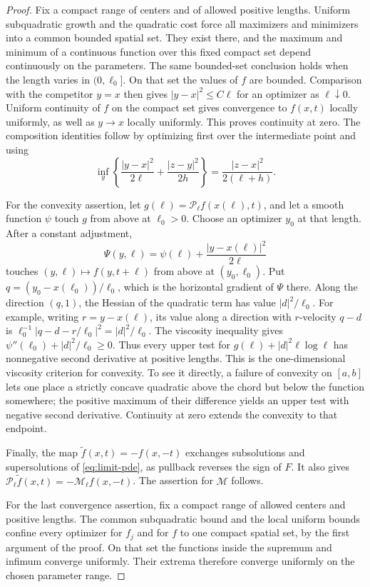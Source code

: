 \documentclass[11pt]{article}
\numberwithin{equation}{section}
\theoremstyle{definition}
\theoremstyle{remark}
\newcommand{\Penv}{\mathcal{P}}
\newcommand{\Menv}{\mathcal{M}}
\begin{document}
\begin{proof}
Fix a compact range of centers and of allowed positive lengths.
Uniform subquadratic growth and the quadratic cost force all
maximizers and minimizers into a common bounded spatial set.
They exist there, and the maximum and minimum of a continuous
function over this fixed compact set depend continuously on the
parameters. The same bounded-set conclusion holds when the
length varies in $(0,\ell_0]$. On that set the values of $f$ are
bounded. Comparison with the competitor $y=x$ then gives
$|y-x|^2\le C\ell$ for an optimizer as $\ell\downarrow0$.
Uniform continuity of $f$ on the compact set gives convergence
to $f(x,t)$ locally uniformly, as well as $y\to x$ locally
uniformly. This proves continuity at zero. The composition
identities follow by optimizing first over the intermediate
point and using
\[
  \inf_y\left\{\frac{|y-x|^2}{2\ell}
           +\frac{|z-y|^2}{2h}\right\}
       =\frac{|z-x|^2}{2(\ell+h)}.
\]

For the convexity assertion, let
$g(\ell)=\Penv_\ell f(x(\ell),t)$, and let a smooth function
$\psi$ touch $g$ from above at $\ell_0>0$. Choose an optimizer
$y_0$ at that length. After a constant adjustment,
\[
  \Psi(y,\ell)=\psi(\ell)+\frac{|y-x(\ell)|^2}{2\ell}
\]
touches $(y,\ell)\mapsto f(y,t+\ell)$ from above at
$(y_0,\ell_0)$. Put $q=(y_0-x(\ell_0))/\ell_0$, which is the
horizontal gradient of $\Psi$ there. Along the direction
$(q,1)$, the Hessian of the quadratic term has value
$|d|^2/\ell_0$. For example, writing $r=y-x(\ell)$, its value
along a direction with $r$-velocity $q-d$ is
$\ell_0^{-1}|q-d-r/\ell_0|^2=|d|^2/\ell_0$.
The viscosity inequality gives
$\psi''(\ell_0)+|d|^2/\ell_0\ge0$. Thus every upper test for
$g(\ell)+|d|^2\ell\log\ell$ has nonnegative second derivative
at positive lengths. This is the one-dimensional viscosity
criterion for convexity. To see it directly, a failure of
convexity on $[a,b]$ lets one place a strictly concave quadratic
above the chord but below the function somewhere; the positive
maximum of their difference yields an upper test with negative
second derivative. Continuity at zero extends the convexity to
that endpoint.

Finally, the map $\widetilde f(x,t)=-f(x,-t)$ exchanges
subsolutions and supersolutions of \eqref{eq:limit-pde}, as
pullback reverses the sign of $F$. It also gives
$\Penv_\ell\widetilde f(x,t)=-\Menv_\ell f(x,-t)$.
The assertion for $\Menv$ follows.

For the last convergence assertion, fix a compact range of allowed centers
and positive lengths. The common subquadratic bound and the local uniform
bounds confine every optimizer for $f_j$ and for $f$ to one compact spatial
set, by the first argument of the proof. On that set the functions inside
the supremum and infimum converge uniformly. Their extrema therefore
converge uniformly on the chosen parameter range.
\end{proof}
\end{document}
